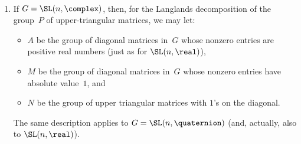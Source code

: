 \begin{eg} \label{MinParabEg} \ 
\noprelistbreak
	\begin{enumerate}
	\item If $G = \SL(n,\complex)$, then, for the Langlands decomposition of the group~$P$ of upper-triangular matrices, we may let:
		\begin{itemize}
		\item $A$ be the group of diagonal matrices in~$G$ whose nonzero entries are positive real numbers (just as for $\SL(n,\real)$),
		\item $M$ be the group of diagonal matrices in~$G$ whose nonzero entries have absolute value~$1$,
		and
		\item $N$ be the group of upper triangular matrices with $1$'s on the diagonal.
		\end{itemize}
	The same description applies to $G = \SL(n,\quaternion)$ (and, actually, also to $\SL(n,\real)$).
	

\end{enumerate}
\end{eg}
